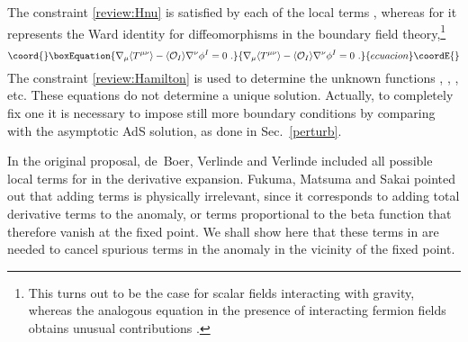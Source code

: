 \documentclass[a4paper,12pt]{article}
\begin{document}
The constraint \eqref{review:Hnu} is satisfied by each of the local
terms \coordHE{}, whereas for \myHighlight{$\Gamma$}\coordHE{} it represents the Ward identity
for diffeomorphisms in the boundary field theory,\footnote{This turns out to 
be the case for scalar fields interacting with gravity, whereas the analogous
equation in the presence of interacting fermion fields obtains unusual
contributions \cite{Kalkkinen00}.}
\begin{equation}\coord{}\boxEquation{
\label{review:Ward}
  \nabla_\mu \langle T^{\mu\nu}\rangle - \langle \mathcal{O}_I \rangle
  \nabla^\nu \phi^I =0~.
}{
\nabla_\mu \langle T^{\mu\nu}\rangle - \langle \mathcal{O}_I \rangle
  \nabla^\nu \phi^I =0~.
}{ecuacion}\coordE{}\end{equation}
The constraint \eqref{review:Hamilton} is used to determine the
unknown functions \coordHE{}, \myHighlight{$\Phi$}\coordHE{}, \coordHE{}, etc. These equations do not 
determine a unique solution. 
Actually, to completely fix one 
it is necessary to impose still more boundary conditions 
by comparing with the asymptotic AdS solution, as done in Sec.~\ref{perturb}. 



In the original proposal, de~Boer, Verlinde and Verlinde included all
possible local terms \coordHE{} for \coordHE{} in the derivative
expansion. Fukuma, Matsuma and Sakai \cite{Fukuma00a} pointed out that
adding terms \coordHE{} is physically irrelevant, since
it corresponds to adding total derivative terms to the anomaly, or terms
proportional to the beta function that therefore vanish at the fixed point. 
We shall show here that these terms in 
\coordHE{} are needed to cancel spurious terms in the anomaly in the 
vicinity of the fixed point. 
\end{document}
